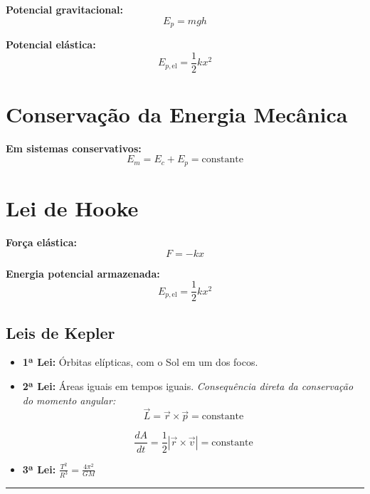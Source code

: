 \documentclass[a4paper,12pt]{article}
\begin{document}
\begin{multicols}{2}
\textbf{Potencial gravitacional:}
\begin{equation*}
  E_p = m g h
\end{equation*}

\textbf{Potencial elástica:}
\begin{equation*}
  E_{p,\text{el}} = \frac{1}{2} k x^2
\end{equation*}

\section{Conservação da Energia Mecânica}

\textbf{Em sistemas conservativos:}
\begin{equation*}
  E_m = E_c + E_p = \text{constante}
\end{equation*}

\section{Lei de Hooke}

\textbf{Força elástica:}
\begin{equation*}
  F = -k x
\end{equation*}

\textbf{Energia potencial armazenada:}
\begin{equation*}
  E_{p,\text{el}} = \frac{1}{2} k x^2
\end{equation*}

\subsection{Leis de Kepler}

\begin{itemize}
  \item \textbf{1ª Lei:} Órbitas elípticas, com o Sol em um dos focos.
  \item \textbf{2ª Lei:} Áreas iguais em tempos iguais. \textit{Consequência direta da 
  conservação do momento angular:}
        \[
        \vec{L} = \vec{r} \times \vec{p} = \text{constante}
        \]

        \[ \frac{dA}{dt} = \frac{1}{2} |\vec{r} \times \vec{v}| = \text{constante} \]

  \item \textbf{3ª Lei:} \( \frac{T^2}{R^3} = \frac{4 \pi^2}{GM}  \)
\end{itemize}

\noindent\rule{\linewidth}{1pt}\\

\end{multicols}
\end{document}
